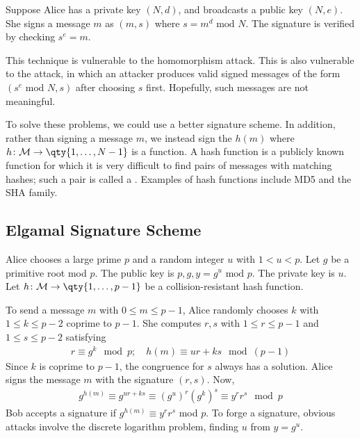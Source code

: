 \begin{example}
    Suppose Alice has a private key $(N, d)$, and broadcasts a public key $(N, e)$.
    She signs a message $m$ as $(m, s)$ where $s = m^d \text{ mod } N$.
    The signature is verified by checking $s^e = m$.

    This technique is vulnerable to the homomorphism attack.
    This is also vulnerable to the  attack, in which an attacker produces valid signed messages of the form $(s^e \text{ mod } N, s)$ after choosing $s$ first.
    Hopefully, such messages are not meaningful.

    To solve these problems, we could use a better signature scheme.
    In addition, rather than signing a message $m$, we instead sign the  $h(m)$ where $h \colon \mathcal M \to \qty{1, \dots, N-1}$ is a  function.
    A hash function is a publicly known function for which it is very difficult to find pairs of messages with matching hashes; such a pair is called a .
    Examples of hash functions include MD5 and the SHA family.
\end{example}

\subsection{Elgamal Signature Scheme}
Alice chooses a large prime $p$ and a random integer $u$ with $1 < u < p$.
Let $g$ be a primitive root mod $p$.
The public key is $p, g, y = g^u \text{ mod } p$.
The private key is $u$.
Let $h \colon \mathcal M \to \qty{1, \dots, p-1}$ be a collision-resistant hash function.

To send a message $m$ with $0 \leq m \leq p-1$, Alice randomly chooses $k$ with $1 \leq k \leq p-2$ coprime to $p-1$.
She computes $r, s$ with $1 \leq r \leq p-1$ and $1 \leq s \leq p-2$ satisfying
\begin{align*}
    r \equiv g^k \mod p;\quad h(m) \equiv ur + ks \mod (p-1)
\end{align*}
Since $k$ is coprime to $p-1$, the congruence for $s$ always has a solution.
Alice signs the message $m$ with the signature $(r, s)$.
Now,
\begin{align*}
    g^{h(m)} \equiv g^{ur + ks} \equiv (g^u)^r (g^k)^s \equiv y^r r^s \mod p
\end{align*}
Bob accepts a signature if $g^{h(m)} \equiv y^r r^s$ mod $p$.
To forge a signature, obvious attacks involve the discrete logarithm problem, finding $u$ from $y = g^u$.

